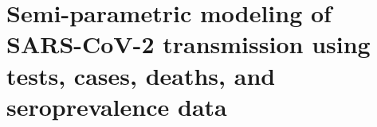 \chapter{Semi-parametric modeling of SARS-CoV-2 transmission using tests, cases, deaths, and seroprevalence data}
\label{ch:content_2}